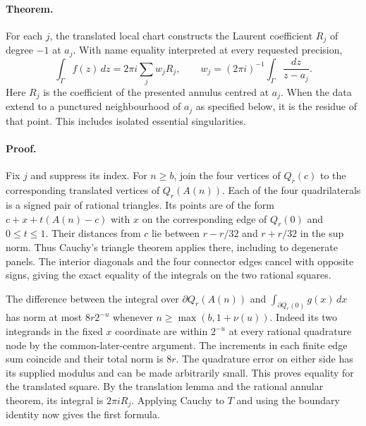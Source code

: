\paragraph{Theorem.}
For each $j$, the translated local chart constructs the Laurent
coefficient $R_j$ of degree $-1$ at $a_j$. With name equality
interpreted at every requested precision,
\[
 \int_\Gamma f(z)\,dz=2\pi i\sum_j w_j R_j,\qquad
 w_j=(2\pi i)^{-1}\int_\Gamma \frac{dz}{z-a_j}.
\]
Here $R_j$ is the coefficient of the presented annulus centred at $a_j$.
When the data extend to a punctured neighbourhood of $a_j$ as specified
below, it is the residue of that point. This includes isolated essential
singularities.

\paragraph{Proof.}
Fix $j$ and suppress its index. For $n\ge b$, join the four vertices
of $Q_r(c)$ to the corresponding translated vertices of $Q_r(A(n))$.
Each of the four quadrilaterals is a signed pair of rational triangles.
Its points are of the form $c+x+t(A(n)-c)$ with $x$ on the corresponding
edge of $Q_r(0)$ and $0\le t\le1$. Their distances from $c$ lie between
$r-r/32$ and $r+r/32$ in the sup norm. Thus Cauchy's triangle theorem
applies there, including to degenerate panels. The interior diagonals
and the four connector edges cancel with opposite signs, giving the
exact equality of the integrals on the two rational squares.

The difference between the integral over $\partial Q_r(A(n))$ and
$\int_{\partial Q_r(0)}g(x)\,dx$ has norm at most $8r2^{-u}$ whenever
$n\ge\max(b,1+\nu(u))$. Indeed its two integrands in the fixed $x$
coordinate are within $2^{-u}$ at every rational quadrature node by
the common-later-centre argument. The increments in each finite edge
sum coincide and their total norm is $8r$. The quadrature error on
either side has its supplied modulus and can be made arbitrarily small.
This proves equality for the translated square. By the translation lemma
and the rational annular theorem, its integral is $2\pi iR_j$.
Applying Cauchy to $T$ and using the boundary identity now gives the
first formula.

